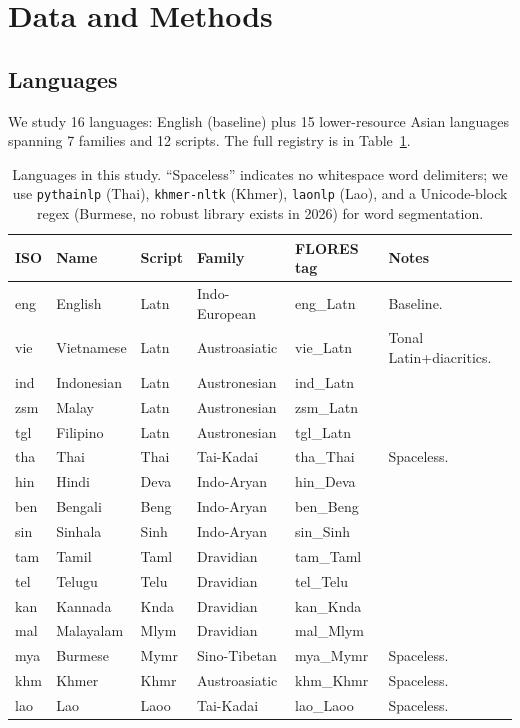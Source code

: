 \documentclass[11pt,a4paper]{article}
\begin{document}
\section{Data and Methods}
\label{sec:methods}

\subsection{Languages}
We study 16 languages: English (baseline) plus 15 lower-resource Asian languages spanning 7 families and 12 scripts. The full registry is in Table~\ref{tab:languages}.

\begin{table}[h]
\centering
\small
\begin{tabularx}{\textwidth}{lllllX}
\toprule
ISO & Name & Script & Family & FLORES tag & Notes \\
\midrule
eng & English & Latn & Indo-European & eng\_Latn & Baseline. \\
vie & Vietnamese & Latn & Austroasiatic & vie\_Latn & Tonal Latin+diacritics. \\
ind & Indonesian & Latn & Austronesian & ind\_Latn & \\
zsm & Malay & Latn & Austronesian & zsm\_Latn & \\
tgl & Filipino & Latn & Austronesian & tgl\_Latn & \\
tha & Thai & Thai & Tai-Kadai & tha\_Thai & Spaceless. \\
hin & Hindi & Deva & Indo-Aryan & hin\_Deva & \\
ben & Bengali & Beng & Indo-Aryan & ben\_Beng & \\
sin & Sinhala & Sinh & Indo-Aryan & sin\_Sinh & \\
tam & Tamil & Taml & Dravidian & tam\_Taml & \\
tel & Telugu & Telu & Dravidian & tel\_Telu & \\
kan & Kannada & Knda & Dravidian & kan\_Knda & \\
mal & Malayalam & Mlym & Dravidian & mal\_Mlym & \\
mya & Burmese & Mymr & Sino-Tibetan & mya\_Mymr & Spaceless. \\
khm & Khmer & Khmr & Austroasiatic & khm\_Khmr & Spaceless. \\
lao & Lao & Laoo & Tai-Kadai & lao\_Laoo & Spaceless. \\
\bottomrule
\end{tabularx}
\caption{Languages in this study. ``Spaceless'' indicates no whitespace word delimiters; we use \texttt{pythainlp} (Thai), \texttt{khmer-nltk} (Khmer), \texttt{laonlp} (Lao), and a Unicode-block regex (Burmese, no robust library exists in 2026) for word segmentation.}
\label{tab:languages}
\end{table}
\end{document}

